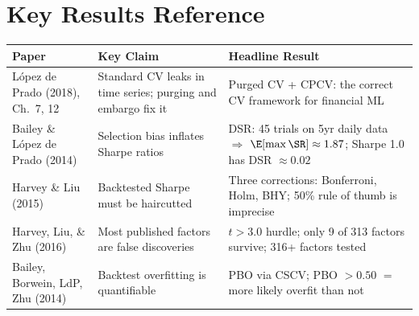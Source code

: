 \section*{Key Results Reference}
\label{sec:ch11-key-results}

\begin{center}
\begin{tabular}{p{4.5cm} p{4cm} p{5cm}}
\toprule
\textbf{Paper} & \textbf{Key Claim} & \textbf{Headline Result} \\
\midrule
L\'{o}pez de Prado (2018), Ch.~7, 12 & Standard CV leaks in time series; purging and embargo fix it & Purged CV + CPCV: the correct CV framework for financial ML \\
\addlinespace
Bailey \& L\'{o}pez de Prado (2014) & Selection bias inflates Sharpe ratios & DSR: 45 trials on 5yr daily data $\Rightarrow$ $\E[\max \SR] \approx 1.87$; Sharpe 1.0 has DSR $\approx 0.02$ \\
\addlinespace
Harvey \& Liu (2015) & Backtested Sharpe must be haircutted & Three corrections: Bonferroni, Holm, BHY; 50\% rule of thumb is imprecise \\
\addlinespace
Harvey, Liu, \& Zhu (2016) & Most published factors are false discoveries & $t > 3.0$ hurdle; only 9 of 313 factors survive; 316+ factors tested \\
\addlinespace
Bailey, Borwein, LdP, Zhu (2014) & Backtest overfitting is quantifiable & PBO via CSCV; PBO $> 0.50$ $=$ more likely overfit than not \\
\bottomrule
\end{tabular}
\end{center}
